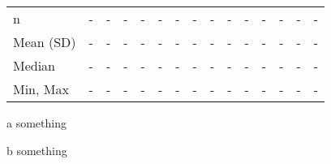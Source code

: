 \documentclass[
]{article}
\begin{document}
\begin{table}
\begin{threeparttable}
{\begin{tabular}[t]{lllllllllllllll}
\hspace{1em}n & - & - & - & - & - & - & - & - & - & - & - & - & - & -\\
\hspace{1em}Mean (SD) & - & - & - & - & - & - & - & - & - & - & - & - & - & -\\
\hspace{1em}Median & - & - & - & - & - & - & - & - & - & - & - & - & - & -\\
\hspace{1em}Min, Max & - & - & - & - & - & - & - & - & - & - & - & - & - & -\\
\bottomrule
\end{tabular}}
\begin{tablenotes}
\small
\item \textit{ } 
\item a something
\item b something
\end{tablenotes}
\end{threeparttable}
\end{table}
\end{document}
